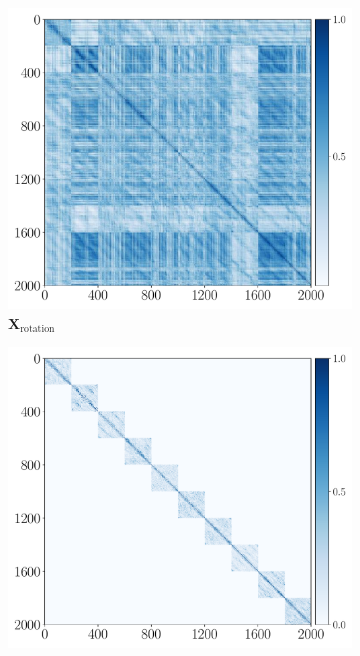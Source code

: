 \documentclass[../../book-main.tex]{subfiles}
\begin{document}
\begin{example}[数字的不变分类]
\begin{figure}[t]
    \begin{subfigure}[t]{0.3\textwidth}
        \centering
        \includegraphics[width=\textwidth]{figs_chap4/mnist1d-heatmap-X_translate_train_all.pdf}
        \caption{$\bm{X}_{\text{rotation}}$}
    \end{subfigure}
    \hfill
    \begin{subfigure}[t]{0.3\textwidth}
        \centering
        \includegraphics[width=\textwidth]{figs_chap4/mnist1d-heatmap-Z_translate_train_all.pdf}

\end{subfigure}
\end{figure}
\end{example}
\end{document}
